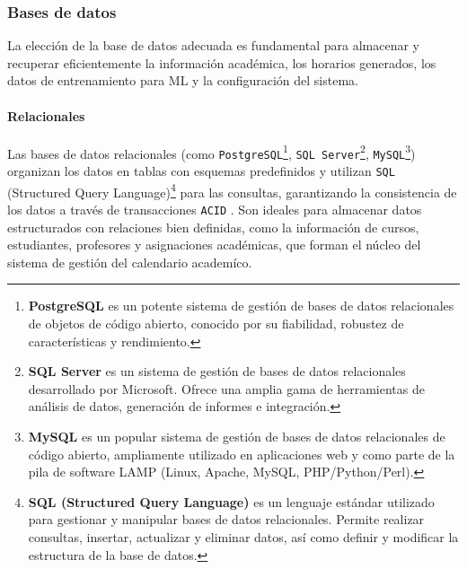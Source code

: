 \subsubsection{Bases de datos}
La elección de la base de datos adecuada es fundamental para almacenar y recuperar eficientemente la información académica, los horarios generados, los datos de entrenamiento para ML y la configuración del sistema.

\paragraph{Relacionales}
Las bases de datos relacionales (como \texttt{PostgreSQL}\footnote{\textbf{PostgreSQL} es un potente sistema de gestión de bases de datos relacionales de objetos de código abierto, conocido por su fiabilidad, robustez de características y rendimiento.}, \texttt{SQL Server}\footnote{\textbf{SQL Server} es un sistema de gestión de bases de datos relacionales desarrollado por Microsoft.
Ofrece una amplia gama de herramientas de análisis de datos, generación de informes e integración.}, \texttt{MySQL}\footnote{\textbf{MySQL} es un popular sistema de gestión de bases de datos relacionales de código abierto, ampliamente utilizado en aplicaciones web y como parte de la pila de software LAMP (Linux, Apache, MySQL, PHP/Python/Perl).}) organizan los datos en tablas con esquemas predefinidos y utilizan \texttt{SQL} (Structured Query Language)\footnote{\textbf{SQL (Structured Query Language)} es un lenguaje estándar utilizado para gestionar y manipular bases de datos relacionales.
Permite realizar consultas, insertar, actualizar y eliminar datos, así como definir y modificar la estructura de la base de datos.} para las consultas, garantizando la consistencia de los datos a través de transacciones \texttt{ACID} \parencite{Date2003}.
Son ideales para almacenar datos estructurados con relaciones bien definidas, como la información de cursos, estudiantes, profesores y asignaciones académicas, que forman el núcleo del sistema de gestión del calendario academíco.

